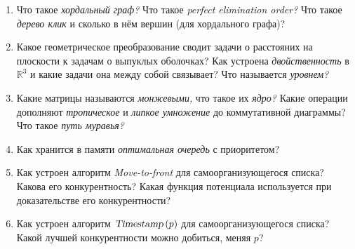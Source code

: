\documentclass[a4paper,10pt]{article}
\begin{document}
\begin{enumerate}[leftmargin=*,itemsep=-0.1mm]
\item Что такое {\sl хордальный граф?} Что такое {\sl perfect elimination order?} Что такое {\sl дерево клик} и сколько в нём вершин (для хордального графа)?

\item Какое геометрическое преобразование сводит задачи о расстояних на плоскости к задачам о выпуклых оболочках? Как устроена {\sl двойственность} в \(\mathbb R^3\) и какие задачи она между собой связывает? Что называется {\sl уровнем?}

\item Какие матрицы называются {\sl монжевыми,} что такое их {\sl ядро?} Какие операции дополняют {\sl тропическое} и {\sl липкое умножение} до коммутативной диаграммы? Что такое {\sl путь муравья?}

\item Как хранится в памяти {\sl оптимальная очередь} с приоритетом?

\item Как устроен алгоритм {\sl Move-to-front} для самоорганизующегося списка? Какова его конкурентность? Какая функция потенциала используется при доказательстве его конкурентности?

\item Как устроен алгоритм \(\text{\sl Timestamp}\,(p)\) для самоорганизующегося списка? Какой лучшей конкурентности можно добиться, меняя \(p\)?
\end{enumerate}
\end{document}
